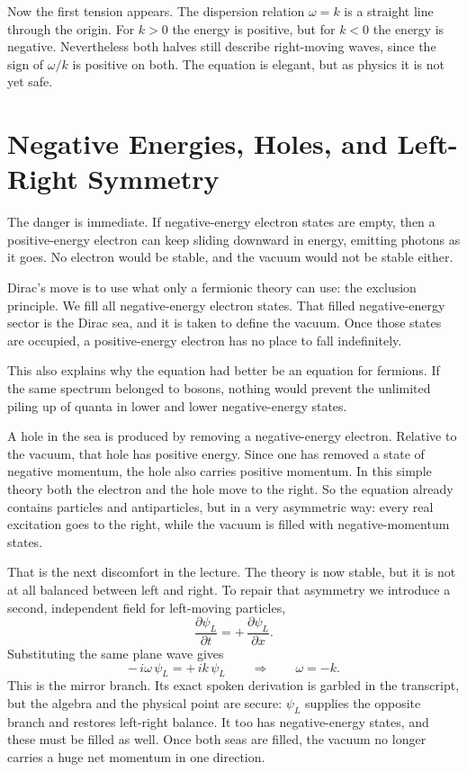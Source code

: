 Now the first tension appears. The dispersion relation \(\omega=k\) is a straight line through the origin. For \(k>0\) the energy is positive, but for \(k<0\) the energy is negative. Nevertheless both halves still describe right-moving waves, since the sign of \(\omega/k\) is positive on both. The equation is elegant, but as physics it is not yet safe.

\section{Negative Energies, Holes, and Left-Right Symmetry}

The danger is immediate. If negative-energy electron states are empty, then a positive-energy electron can keep sliding downward in energy, emitting photons as it goes. No electron would be stable, and the vacuum would not be stable either.

Dirac's move is to use what only a fermionic theory can use: the exclusion principle. We fill all negative-energy electron states. That filled negative-energy sector is the Dirac sea, and it is taken to define the vacuum. Once those states are occupied, a positive-energy electron has no place to fall indefinitely.

This also explains why the equation had better be an equation for fermions. If the same spectrum belonged to bosons, nothing would prevent the unlimited piling up of quanta in lower and lower negative-energy states.

A hole in the sea is produced by removing a negative-energy electron. Relative to the vacuum, that hole has positive energy. Since one has removed a state of negative momentum, the hole also carries positive momentum. In this simple theory both the electron and the hole move to the right. So the equation already contains particles and antiparticles, but in a very asymmetric way: every real excitation goes to the right, while the vacuum is filled with negative-momentum states.

That is the next discomfort in the lecture. The theory is now stable, but it is not at all balanced between left and right. To repair that asymmetry we introduce a second, independent field for left-moving particles,
\begin{equation}
\frac{\partial \psi_L}{\partial t}=+\,\frac{\partial \psi_L}{\partial x}.
\end{equation}
Substituting the same plane wave gives
\begin{equation}
-\,i\omega\,\psi_L = +\,ik\,\psi_L
\qquad \Longrightarrow \qquad
\omega=-k.
\end{equation}
This is the mirror branch. Its exact spoken derivation is garbled in the transcript, but the algebra and the physical point are secure: \(\psi_L\) supplies the opposite branch and restores left-right balance. It too has negative-energy states, and these must be filled as well. Once both seas are filled, the vacuum no longer carries a huge net momentum in one direction.

